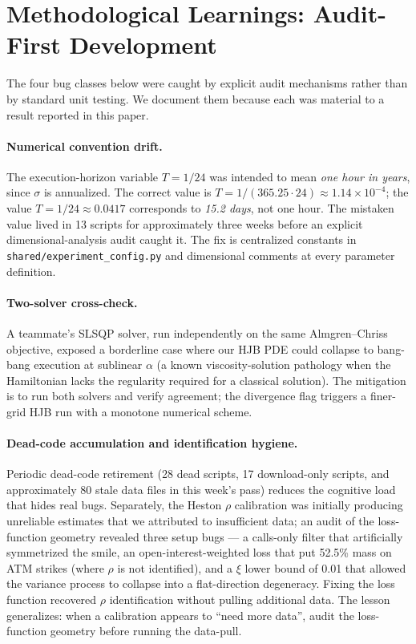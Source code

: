 \documentclass[11pt,letterpaper]{article}
\begin{document}
\section{Methodological Learnings: Audit-First Development}
\label{sec:audit}

The four bug classes below were caught by explicit audit mechanisms rather than by standard unit testing. We document them because each was material to a result reported in this paper.

\paragraph{Numerical convention drift.} The execution-horizon variable \(T=1/24\) was intended to mean \emph{one hour in years}, since \(\sigma\) is annualized. The correct value is \(T=1/(365.25\cdot 24)\approx 1.14\!\times\!10^{-4}\); the value \(T=1/24\approx 0.0417\) corresponds to \emph{15.2 days}, not one hour. The mistaken value lived in 13 scripts for approximately three weeks before an explicit dimensional-analysis audit caught it. The fix is centralized constants in \texttt{shared/experiment\_config.py} and dimensional comments at every parameter definition.

\paragraph{Two-solver cross-check.} A teammate's SLSQP solver, run independently on the same Almgren--Chriss objective, exposed a borderline case where our HJB PDE could collapse to bang-bang execution at sublinear \(\alpha\) (a known viscosity-solution pathology when the Hamiltonian lacks the regularity required for a classical solution). The mitigation is to run both solvers and verify agreement; the divergence flag triggers a finer-grid HJB run with a monotone numerical scheme.

\paragraph{Dead-code accumulation and identification hygiene.} Periodic dead-code retirement (28 dead scripts, 17 download-only scripts, and approximately 80 stale data files in this week's pass) reduces the cognitive load that hides real bugs. Separately, the Heston \(\rho\) calibration was initially producing unreliable estimates that we attributed to insufficient data; an audit of the loss-function geometry revealed three setup bugs --- a calls-only filter that artificially symmetrized the smile, an open-interest-weighted loss that put 52.5\% mass on ATM strikes (where \(\rho\) is not identified), and a \(\xi\) lower bound of 0.01 that allowed the variance process to collapse into a flat-direction degeneracy. Fixing the loss function recovered \(\rho\) identification without pulling additional data. The lesson generalizes: when a calibration appears to ``need more data'', audit the loss-function geometry before running the data-pull.
\end{document}
